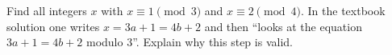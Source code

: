 Find all integers $x$ with $x\equiv1\pmod3$ and $x\equiv2\pmod4$. In the textbook solution one writes $x=3a+1=4b+2$ and then ``looks at the equation $3a+1=4b+2$ modulo $3$''. Explain why this step is valid.
